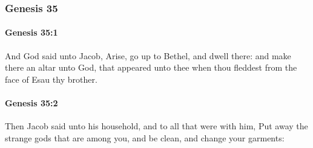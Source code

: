 	\subsubsection{Genesis 35} %
		\label{GENESIS-35}

		\paragraph{Genesis 35:1} %
			\label{GENESIS-35-1}

			And God said unto Jacob, Arise, go up to Bethel, and dwell there: and make there an altar unto God, that appeared unto thee when thou fleddest from the face of Esau thy brother.


		\paragraph{Genesis 35:2} %
			\label{GENESIS-35-2}

			Then Jacob said unto his household, and to all that were with him, Put away the strange gods that are among you, and be clean, and change your garments:

